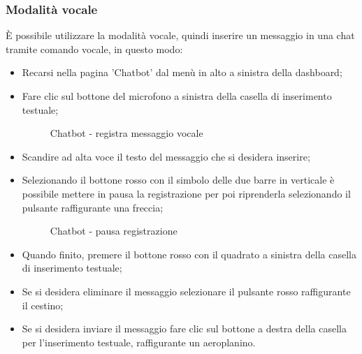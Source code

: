 \documentclass[10pt, a4paper]{article}
\begin{document}
\subsubsection{Modalità vocale}
È possibile utilizzare la modalità vocale, quindi inserire un messaggio in una chat tramite comando vocale, in questo modo:
\begin{itemize}
    \item Recarsi nella pagina 'Chatbot' dal menù in alto a sinistra della dashboard;
    \item Fare clic sul bottone del microfono a sinistra della casella di inserimento testuale;
    \begin{figure}[H]
        \centering  
        \caption{Chatbot - registra messaggio vocale}
    \end{figure}
    \item Scandire ad alta voce il testo del messaggio che si desidera inserire;
    \item Selezionando il bottone rosso con il simbolo delle due barre in verticale è possibile mettere in pausa la registrazione per poi riprenderla selezionando il pulsante raffigurante una freccia;
    \begin{figure}[H]
        \centering  
        \caption{Chatbot - pausa registrazione}
    \end{figure}
    \item Quando finito, premere il bottone rosso con il quadrato a sinistra della casella di inserimento testuale;
    
    \item Se si desidera eliminare il messaggio selezionare il pulsante rosso raffigurante il cestino;
    \item Se si desidera inviare il messaggio fare clic sul bottone a destra della casella per l'inserimento testuale, raffigurante un aeroplanino.
\end{itemize}
\end{document}
